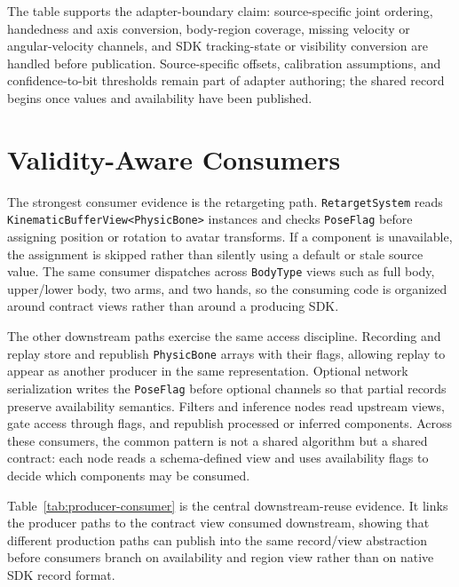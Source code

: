 \documentclass[runningheads]{llncs}
\begin{document}
The table supports the adapter-boundary claim: source-specific joint ordering, handedness and axis conversion, body-region coverage, missing velocity or angular-velocity channels, and SDK tracking-state or visibility conversion are handled before publication. Source-specific offsets, calibration assumptions, and confidence-to-bit thresholds remain part of adapter authoring; the shared record begins once values and availability have been published.

\section{Validity-Aware Consumers}\label{sec:consumers}
The strongest consumer evidence is the retargeting path. \texttt{RetargetSystem} reads \texttt{KinematicBufferView<PhysicBone>} instances and checks \texttt{PoseFlag} before assigning position or rotation to avatar transforms. If a component is unavailable, the assignment is skipped rather than silently using a default or stale source value. The same consumer dispatches across \texttt{BodyType} views such as full body, upper/lower body, two arms, and two hands, so the consuming code is organized around contract views rather than around a producing SDK.

The other downstream paths exercise the same access discipline. Recording and replay store and republish \texttt{PhysicBone} arrays with their flags, allowing replay to appear as another producer in the same representation. Optional network serialization writes the \texttt{PoseFlag} before optional channels so that partial records preserve availability semantics. Filters and inference nodes read upstream views, gate access through flags, and republish processed or inferred components. Across these consumers, the common pattern is not a shared algorithm but a shared contract: each node reads a schema-defined view and uses availability flags to decide which components may be consumed.

Table~\ref{tab:producer-consumer} is the central downstream-reuse evidence. It links the producer paths to the contract view consumed downstream, showing that different production paths can publish into the same record/view abstraction before consumers branch on availability and region view rather than on native SDK record format.
\end{document}

